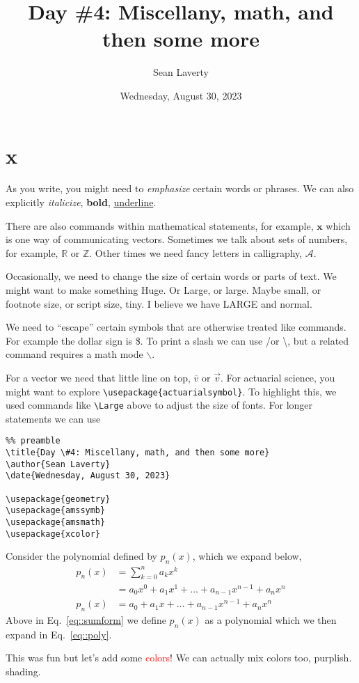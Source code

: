 \documentclass[12pt]{article}
\title{Day \#4: Miscellany, math, and then some more}
\author{Sean Laverty}
\date{Wednesday, August 30, 2023}
\begin{document}
\maketitle
\newpage
\section{x}
\noindent\indent As you write, you might need to \emph{emphasize} certain words or phrases.  We can also explicitly \textit{italicize}, \textbf{bold}, \underline{underline}.

There are also commands within mathematical statements, for example, \(\mathbf{x}\) which is one way of communicating vectors.  Sometimes we talk about sets of numbers, for example, \(\mathbb{R} \text{ or } \mathbb{Z}\).  Other times we need fancy letters in calligraphy, \(\mathcal{A}\). 

Occasionally, we need to change the size of certain words or parts of text.  We might want to make something {\Huge{Huge}}. Or {\Large{Large}}, or {\large{large}}. Maybe {\small{small}}, or {\footnotesize{footnote size}}, or {\scriptsize{script size}}, {\tiny{tiny}}.  I believe we have {\LARGE{LARGE}} and {\normalsize{normal}}.

We need to ``escape'' certain symbols that are otherwise treated like commands.  For example the dollar sign is \$.  To print a slash we can use \slash or \textbackslash, but a related command requires a math mode \(\backslash\).

For a vector we need that little line on top, \(\overline{v}\) or \(\vec{v}\).  For actuarial science, you might want to explore \verb|\usepackage{actuarialsymbol}|.  To highlight this, we used commands like \verb|\Large| above to adjust the size of fonts.  For longer statements we can use \begin{verbatim} 
%% preamble
\title{Day \#4: Miscellany, math, and then some more}
\author{Sean Laverty}
\date{Wednesday, August 30, 2023}

\usepackage{geometry}
\usepackage{amssymb}
\usepackage{amsmath}
\usepackage{xcolor}
\end{verbatim}

Consider the polynomial defined by \(p_n(x)\), which we expand below,
\begin{align}
p_{n}(x) &= \sum_{k=0}^n a_{k}x^{k}\label{eq::sumform}\\
& = a_{0}x^{0} + a_{1}x^{1} + \dots + a_{n-1}x^{n-1} + a_{n}x^n\nonumber\\
p_{n}(x) & = a_{0} + a_{1}x + \dots + a_{n-1}x^{n-1} + a_{n}x^n\label{eq::poly}
\end{align}
Above in Eq.~\eqref{eq::sumform} we define \(p_{n}(x)\) as a polynomial which we then expand in Eq.~\eqref{eq::poly}.

This was fun but let's add some \textcolor{red}{colors}!  We can actually mix colors too, \textcolor{red!50!blue}{purplish}.  
{\Huge{\textcolor{black!10!white}{shading}}}.
\end{document}
